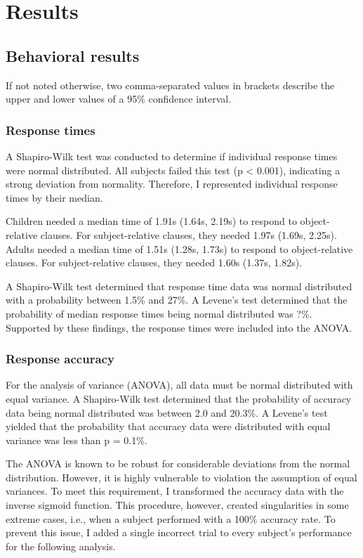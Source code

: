 \chapter{Results}\label{results}

\section{Behavioral results}

If not noted otherwise, two comma-separated values in brackets describe the upper and lower values of a 95\% confidence interval.

\subsection{Response times}

A Shapiro-Wilk test was conducted to determine if individual response times were normal distributed.
All subjects failed this test (p < 0.001), indicating a strong deviation from normality.
Therefore, I represented individual response times by their median.

Children needed a median time of 1.91s (1.64s, 2.19s) to respond to object-relative clauses.
For subject-relative clauses, they needed 1.97s (1.69s, 2.25s).
Adults needed a median time of 1.51s (1.28s, 1.73s) to respond to object-relative clauses.
For subject-relative clauses, they needed 1.60s (1.37s, 1.82s).

A Shapiro-Wilk test determined that response time data was normal distributed with a probability between 1.5\% and 27\%.
A Levene's test determined that the probability of median response times being normal distributed was ?\%.
Supported by these findings, the response times were included into the ANOVA.

\subsection{Response accuracy}

For the analysis of variance (ANOVA), all data must be normal distributed with equal variance.
A Shapiro-Wilk test determined that the probability of accuracy data being normal distributed was between 2.0 and 20.3\%.
A Levene's test yielded that the probability that accuracy data were distributed with equal variance was less than p = 0.1\%.

The ANOVA is known to be robust for considerable deviations from the normal distribution.
However, it is highly vulnerable to violation the assumption of equal variances.
To meet this requirement, I transformed the accuracy data with the inverse sigmoid function.
This procedure, however, created singularities in some extreme cases, i.e., when a subject performed with a 100\% accuracy rate.
To prevent this issue, I added a single incorrect trial to every subject's performance for the following analysis.

